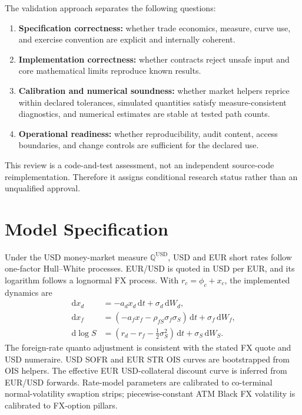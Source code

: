 \documentclass[conference]{IEEEtran}
\newcommand{\Qd}{\mathbb{Q}^{\mathrm{USD}}}
\newcommand{\dd}{\,\mathrm{d}}
\begin{document}
The validation approach separates the following questions:
\begin{enumerate}
  \item \textbf{Specification correctness:} whether trade economics, measure, curve use, and exercise convention are explicit and internally coherent.
  \item \textbf{Implementation correctness:} whether contracts reject unsafe input and core mathematical limits reproduce known results.
  \item \textbf{Calibration and numerical soundness:} whether market helpers reprice within declared tolerances, simulated quantities satisfy measure-consistent diagnostics, and numerical estimates are stable at tested path counts.
  \item \textbf{Operational readiness:} whether reproducibility, audit content, access boundaries, and change controls are sufficient for the declared use.
\end{enumerate}

This review is a code-and-test assessment, not an independent source-code reimplementation. Therefore it assigns conditional research status rather than an unqualified approval.

\section{Model Specification}

Under the USD money-market measure $\Qd$, USD and EUR short rates follow one-factor Hull--White processes. EUR/USD is quoted in USD per EUR, and its logarithm follows a lognormal FX process. With $r_c=\phi_c+x_c$, the implemented dynamics are
\begin{align}
 \dd x_d &= -a_dx_d\dd t + \sigma_d\dd W_d,\\
 \dd x_f &= \left(-a_fx_f-\rho_{fS}\sigma_f\sigma_S\right)\dd t
             +\sigma_f\dd W_f,\\
 \dd\log S &= \left(r_d-r_f-\tfrac12\sigma_S^2\right)\dd t
             +\sigma_S\dd W_S.
\end{align}
The foreign-rate quanto adjustment is consistent with the stated FX quote and USD numeraire. USD SOFR and EUR \texteuro STR OIS curves are bootstrapped from OIS helpers. The effective EUR USD-collateral discount curve is inferred from EUR/USD forwards. Rate-model parameters are calibrated to co-terminal normal-volatility swaption strips; piecewise-constant ATM Black FX volatility is calibrated to FX-option pillars.
\end{document}
